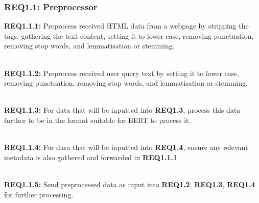 \subsubsection{REQ1.1: Preprocessor}

\textbf{REQ1.1.1:} Preprocess received HTML data from a webpage by stripping the tags, gathering the text content, setting it to lower case, removing punctuation, removing stop words, and lemmatisation or stemming.\par

\textbf{\\REQ1.1.2:} Preprocess received user query text by setting it to lower case, removing punctuation, removing stop words, and lemmatisation or stemming.\par

\textbf{\\REQ1.1.3:} For data that will be inputted into \textbf{REQ1.3}, process this data further to be in the format suitable for BERT to process it.\par

\textbf{\\REQ1.1.4:} For dara that will be inputted into \textbf{REQ1.4}, ensure any relevant metadata is also gathered and forwarded in \textbf{REQ1.1.1}\par

\textbf{\\REQ1.1.5:} Send preprocessed data as input into \textbf{REQ1.2}, \textbf{REQ1.3}, \textbf{REQ1.4} for further processing.\par
